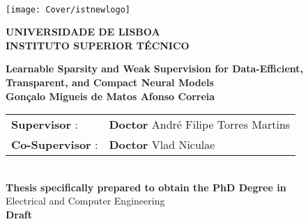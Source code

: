 \setcounter{page}{1} 


\thispagestyle{empty}
\begin{flushleft} ~\\ \vspace{-22mm} \hspace{-12mm}  \texttt{[image: Cover/istnewlogo]}

    \centering
    \Large \textbf{UNIVERSIDADE DE LISBOA \\ INSTITUTO SUPERIOR TÉCNICO}
    \vspace{30mm}

    \vspace{5mm}

    \centering
    \Large \textbf{Learnable Sparsity and Weak Supervision for Data-Efficient, Transparent, and Compact Neural Models}
    \\ \vspace{2cm}  %
    \large \textbf{Gonçalo Migueis de Matos Afonso Correia} \\
    \vspace{3cm}

    \begin{minipage}{\textwidth}
        \begin{tabularx}{\textwidth}{ l @{ } l }
            \textbf{Supervisor} :    & \textbf{Doctor} André Filipe Torres Martins \\
            \textbf{Co-Supervisor} : & \textbf{Doctor} Vlad Niculae                \\
        \end{tabularx}
    \end{minipage}
    \\ \vspace{20mm}
    \centering
    \large \textbf{Thesis specifically prepared to obtain the PhD Degree in}\\
    \large Electrical and Computer Engineering\\
    \vspace{18mm}
    \Large \textbf{Draft}


\end{flushleft}
